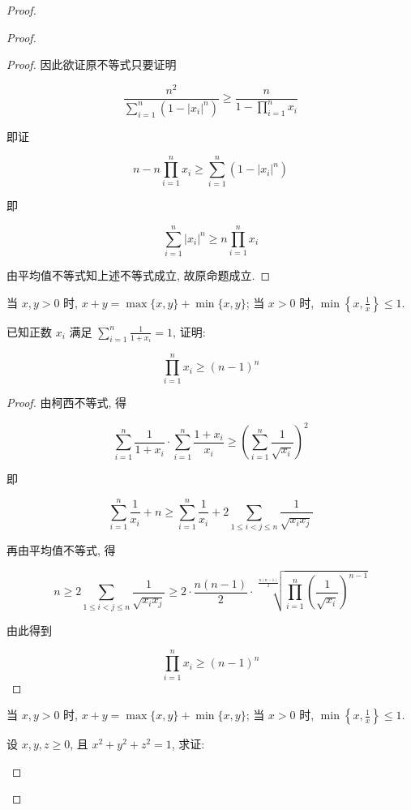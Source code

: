 \begin{proof}
\begin{example}
\begin{solution}
\begin{note}
\begin{solution}
\begin{proof}
\begin{proof}
	因此欲证原不等式只要证明
	
	$$
	\frac{n^{2}}{\sum_{i=1}^{n}\left(1-\left|x_{i}\right|^{n}\right)} \geqslant \frac{n}{1-\prod_{i=1}^{n} x_{i}}
	$$
	
	即证
	
	$$
	n-n \prod_{i=1}^{n} x_{i} \geqslant \sum_{i=1}^{n}\left(1-\left|x_{i}\right|^{n}\right)
	$$
	
	即
	
	$$
	\sum_{i=1}^{n}\left|x_{i}\right|^{n} \geqslant n \prod_{i=1}^{n} x_{i}
	$$
	
	由平均值不等式知上述不等式成立, 故原命题成立.
\end{proof}
\begin{note}
	当 $x, y>0$ 时, $x+y=\max \{x, y\}+\min \{x, y\}$; 当 $x>0$ 时, $\min \left\{x, \frac{1}{x}\right\} \leqslant 1$.
\end{note}

\begin{example}
	已知正数 $x_{i}$ 满足 $\sum_{i=1}^{n} \frac{1}{1+x_{i}}=1$, 证明:
	
	$$
	\prod_{i=1}^{n} x_{i} \geqslant(n-1)^{n}
	$$
\end{example}
\begin{proof}
	由柯西不等式, 得
	
	$$
	\sum_{i=1}^{n} \frac{1}{1+x_{i}} \cdot \sum_{i=1}^{n} \frac{1+x_{i}}{x_{i}} \geqslant\left(\sum_{i=1}^{n} \frac{1}{\sqrt{x_{i}}}\right)^{2}
	$$
	
	即
	
	$$
	\sum_{i=1}^{n} \frac{1}{x_{i}}+n \geqslant \sum_{i=1}^{n} \frac{1}{x_{i}}+2 \sum_{1 \leqslant i<j \leqslant n} \frac{1}{\sqrt{x_{i} x_{j}}}
	$$
	
	再由平均值不等式, 得
	
	$$
	n \geqslant 2 \sum_{1 \leqslant i<j \leqslant n} \frac{1}{\sqrt{x_{i} x_{j}}} \geqslant 2 \cdot \frac{n(n-1)}{2} \cdot \sqrt[\frac{n(n-1)}{2}]{\prod_{i=1}^{n}\left(\frac{1}{\sqrt{x_{i}}}\right)^{n-1}}
	$$
	
	由此得到
	
	$$
	\prod_{i=1}^{n} x_{i} \geqslant(n-1)^{n}
	$$
\end{proof}
\begin{note}
	当 $x, y>0$ 时, $x+y=\max \{x, y\}+\min \{x, y\}$; 当 $x>0$ 时, $\min \left\{x, \frac{1}{x}\right\} \leqslant 1$.
\end{note}

\begin{example}
	设 $x, y, z \geqslant 0$, 且 $x^{2}+y^{2}+z^{2}=1$, 求证:
	

\end{example}
\end{proof}
\end{solution}
\end{note}
\end{solution}
\end{example}
\end{proof}
